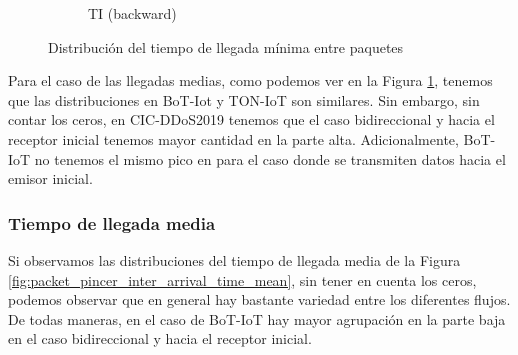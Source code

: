 \begin{figure}[H]
\begin{subfigure}[b]{0.26\textwidth}
        \caption{TI (backward)}
    \end{subfigure}
    \hfill
       \caption{Distribución del tiempo de llegada mínima entre paquetes}
       \label{fig:packet_pincer_inter_arrival_time_min}
\end{figure}

Para el caso de las llegadas medias, como podemos ver en la Figura \ref{fig:packet_pincer_inter_arrival_time_min}, tenemos que las distribuciones en BoT-Iot y TON-IoT son similares. Sin embargo, sin contar los ceros, en CIC-DDoS2019 tenemos que el caso bidireccional y hacia el receptor inicial tenemos mayor cantidad en la parte alta. Adicionalmente, BoT-IoT no tenemos el mismo pico en para el caso donde se transmiten datos hacia el emisor inicial.

\subsubsection{Tiempo de llegada media}

Si observamos las distribuciones del tiempo de llegada media de la Figura \ref{fig:packet_pincer_inter_arrival_time_mean}, sin tener en cuenta los ceros, podemos observar que en general hay bastante variedad entre los diferentes flujos. De todas maneras, en el caso de BoT-IoT hay mayor agrupación en la parte baja en el caso bidireccional y hacia el receptor inicial.

